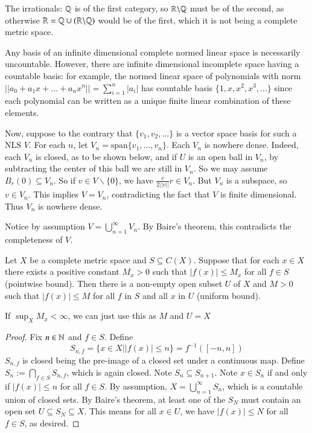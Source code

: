 \begin{eg}
    The irrationals: $\mathbb Q$ is of the first category, so $\mathbb R\backslash \mathbb Q$ must be of the second, as otherwise $\mathbb R = \mathbb Q\cup (\mathbb R\backslash \mathbb Q)$ would be of the first, which it is not being a complete metric space.
\end{eg}

\begin{eg}
    Any basis of an infinite dimensional complete normed linear space is necessarily uncountable. However, there are infinite dimensional incomplete space having a countable basis: for example, the normed linear space of polynomials with norm $||a_0+a_1x+...+a_nx^n|| = \sum_{i=1}^n|a_i|$ has countable basis $\{1,x,x^2,x^3,...\}$ since each polynomial can be written as a unique finite linear combination of these elements.

    Now, suppose to the contrary that $\{v_1,v_2,...\}$ is a vector space basis for such a NLS $V$. For each $n$, let $V_n = \text{span}\{v_1,...,v_n\}$. Each $V_n$ is nowhere dense. Indeed, each $V_n$ is closed, as to be shown below, and if $U$ is an open ball in $V_n$, by subtracting the center of this ball we are still in $V_n$. So we may assume $B_r(0) \subseteq V_n$. So if $v \in V\backslash \{0\}$, we have $\frac{v}{2||v||}r \in V_n$. But $V_n$ is a subspace, so $v \in V_n$. This implies $V = V_n$, contradicting the fact that $V$ is finite dimensional. Thus $V_n$ is nowhere dense. 

    Notice by assumption $V = \bigcup_{n=1}^{\infty}V_n$. By Baire's theorem, this contradicts the completeness of $V$.
\end{eg}

\begin{namthm}
    Let $X$ be a complete metric space and $S \subseteq C(X)$. Suppose that for each $x \in X$ there exists a positive constant $M_x > 0$ such that $|f(x)| \leq M_x$ for all $f \in S$ (pointwise bound). Then there is a non-empty open subset $U$ of $X$ and $M > 0$ such that $|f(x)| \leq M$ for all $f$ in $S$ and all $x$ in $U$ (uniform bound).
\end{namthm}
If $\sup_XM_x < \infty$, we can just use this as $M$ and $U = X$
\begin{proof}
    Fix $n \in \mathbb N$ and $f \in S$. Define $$S_{n,f} = \{x \in X\vert |f(x)| \leq n\} = f^{-1}([-n,n])$$ $S_{n,f}$ is closed being the pre-image of a closed set under a continuous map. Define $S_n := \bigcap_{f \in S}S_{n,f}$, which is again closed. Note $S_n \subseteq S_{n+1}$. Note $x \in S_n$ if and only if $|f(x)| \leq n$ for all $f \in S$. By assumption, $X = \bigcup_{n=1}^{\infty}S_n$, which is a countable union of closed sets. By Baire's theorem, at least one of the $S_N$ must contain an open set $U \subseteq S_N \subseteq X$. This means for all $x \in U$, we have $|f(x)| \leq N$ for all $f \in S$, as desired.
\end{proof}

